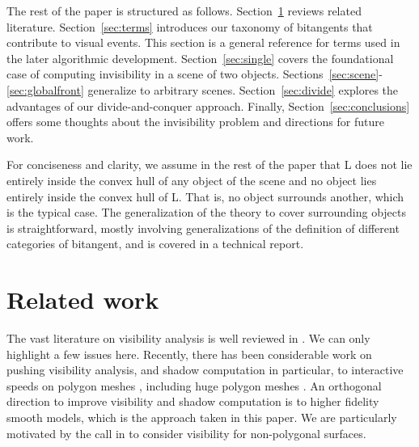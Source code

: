 \documentclass[9pt,twocolumn]{article}
\newif\ifSurrounding    %
\begin{document}
The rest of the paper is structured as follows.
Section~\ref{sec:lit} reviews related literature.
Section~\ref{sec:terms} introduces our taxonomy of bitangents that contribute
to visual events. 
This section is a general reference for terms used in the later algorithmic development.
Section~\ref{sec:single} covers the foundational case of computing 
invisibility in a scene of two objects.
Sections~\ref{sec:scene}-\ref{sec:globalfront} generalize to arbitrary scenes.
Section~\ref{sec:divide} explores the advantages of our divide-and-conquer approach.
Finally, Section~\ref{sec:conclusions} offers some thoughts about the invisibility problem
and directions for future work.

\ifSurrounding
\else
For conciseness and clarity, we assume in the rest of the paper that 
L does not lie entirely inside the convex hull of any object of the scene
and no object lies entirely inside the convex hull of L.
That is, no object surrounds another, which is the typical case.
The generalization of the theory to cover surrounding objects is straightforward,
mostly involving generalizations of the definition of different
categories of bitangent, and is covered in a technical report.
\fi




\section{Related work}
\label{sec:lit}


The vast literature on visibility analysis is well reviewed in \cite{durand00a}.
We can only highlight a few issues here.
Recently, there has been considerable work on pushing visibility analysis,
and shadow computation in particular,
to interactive speeds on polygon meshes \cite{assarsson03,bala03,sen03},
including huge polygon meshes \cite{unc03}.
An orthogonal direction to improve visibility and shadow computation is to higher
fidelity smooth models, which is the approach taken in this paper.
We are particularly 
motivated by the call in \cite{hart99} to consider visibility for non-polygonal surfaces.
\end{document}
